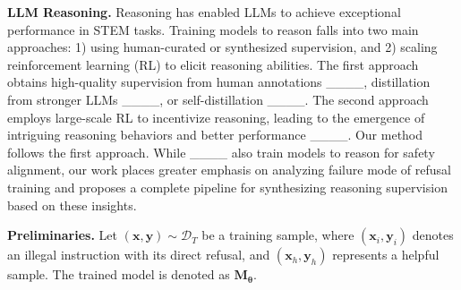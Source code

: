 \vspace{-0.13cm}
\textbf{LLM Reasoning.} Reasoning has enabled LLMs to achieve exceptional performance in STEM tasks. Training models to reason falls into two main approaches: 1) using human-curated or synthesized supervision, and 2) scaling reinforcement learning (RL) to elicit reasoning abilities. The first approach obtains high-quality supervision from human annotations ____, distillation from stronger LLMs ____, or self-distillation ____.
The second approach employs large-scale RL to incentivize reasoning, leading to the emergence of intriguing reasoning behaviors and better performance ____. Our method follows the first approach. While ____ also train models to reason for safety alignment, our work places greater emphasis on analyzing failure mode of refusal training and proposes a complete pipeline for synthesizing reasoning supervision based on these insights.


\vspace{-0.13cm}
\textbf{Preliminaries.} Let $(\bm{x}, \bm{y})\sim \mathcal{D}_T$ be a training sample, where $(\bm{x}_i, \bm{y}_i)$ denotes an illegal instruction with its direct refusal, and $(\bm{x}_h, \bm{y}_h)$ represents a helpful sample. The trained model is denoted as $\bm{M}_{{\bm{\theta}}}$.


\vspace{-0.2cm}